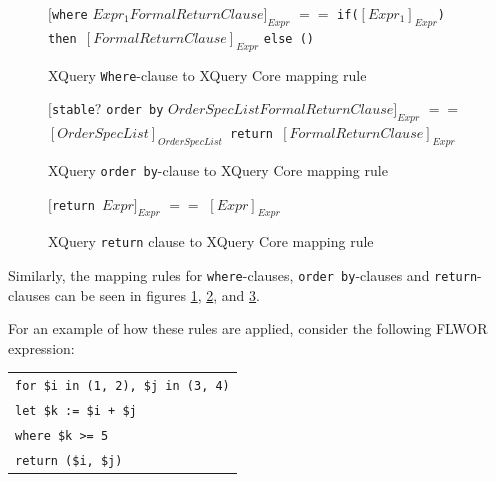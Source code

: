 \begin{figure}[!h]
\centering
$[$\texttt{where} $Expr_1 FormalReturnClause]_{Expr}$ \newline
$==$ \newline
\texttt{if(}$[Expr_1]_{Expr}$\texttt{) then }$[FormalReturnClause]_{Expr}$ \texttt{else ()}
  \caption{XQuery \texttt{Where}-clause to XQuery Core mapping rule}
  \label{figure:xquery:where_mapping_rule}
\end{figure}

\begin{figure}[!h]
\centering
$[$\texttt{stable}$?$ \texttt{order by} $OrderSpecList FormalReturnClause]_{Expr}$ \newline
$==$ \newline
$[OrderSpecList]_{OrderSpecList}$\texttt{ return }$[FormalReturnClause]_{Expr}$
  \caption{XQuery \texttt{order by}-clause to XQuery Core mapping rule}
  \label{figure:xquery:orderby_mapping_rule}
\end{figure}

\begin{figure}[!h]
\centering
$[$\texttt{return }$Expr]_{Expr}$ \newline
$==$ \newline
$[Expr]_{Expr}$
  \caption{XQuery \texttt{return} clause to XQuery Core mapping rule}
  \label{figure:xquery:return_mapping_rule}
\end{figure}

Similarly, the mapping rules for \texttt{where}-clauses, \texttt{order by}-clauses and
\texttt{return}-clauses can be seen in figures \ref{figure:xquery:where_mapping_rule},
\ref{figure:xquery:orderby_mapping_rule},
and \ref{figure:xquery:return_mapping_rule}.

For an example of how these rules are applied, consider the following FLWOR
expression:
%
\begin{center}
\begin{tabular}{l}
\texttt{for \$i in (1, 2), \$j in (3, 4)} \\
  \texttt{let \$k := \$i + \$j} \\
  \texttt{where \$k >= 5} \\
   \texttt{return (\$i, \$j)} \\
\end{tabular}
\end{center}

